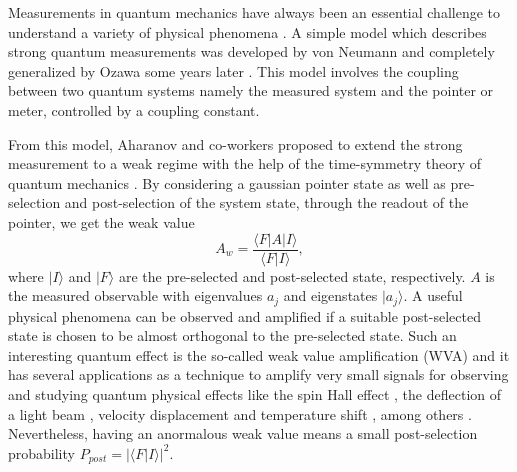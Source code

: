 \documentclass[aps,pra,preprint,superscriptaddress, showpacs]{revtex4-2}
\begin{document}
Measurements in quantum mechanics have always been an essential challenge to understand a variety of physical phenomena \cite{peres1993quantum,aharonov2005quantum,jacobs2014quantum}. A simple model which describes strong quantum measurements was developed by von Neumann \cite{neumann1955mathematical} and completely generalized by Ozawa some years later \cite{ozawa1984quantum}. This model involves the coupling between two quantum systems namely the measured system and the pointer or meter, controlled by a coupling constant.   %

From this model, Aharanov and co-workers \cite{aharonov1988result} proposed to extend the strong measurement to a weak regime with the help of the time-symmetry theory of quantum mechanics \cite{aharonov1964time}. By considering a gaussian pointer state as well as pre-selection and post-selection of the system state, through the readout of the pointer, we get the weak value
\begin{equation}\label{weak.value}
A_{w}=\frac{\langle F|A|I\rangle}{\langle F|I\rangle},
\end{equation}
where $|I\rangle$ and $|F\rangle$ are the pre-selected and post-selected state, respectively. $A$ is the measured observable with eigenvalues $a_j$ and eigenstates $|a_{j}\rangle$. A useful physical phenomena can be observed and amplified if a suitable post-selected state is chosen to be almost orthogonal to the pre-selected state. Such an interesting quantum effect is the so-called weak value amplification (WVA) and it has several applications as a technique to amplify very small signals for observing and studying quantum physical effects like the spin Hall effect \cite{hosten2008observation}, the deflection of a light beam \cite{dixon2009ultrasensitive}, velocity displacement \cite{viza2013weak} and temperature shift \cite{egan2012weak}, among others \cite{starling2010continuous, simon2011fock,magana2014amplification,jordan2014technical,zhang2015application}. Nevertheless, having an anormalous weak value means a small post-selection probability $P_{post}=|\langle F|I \rangle|^2$.
\end{document}
